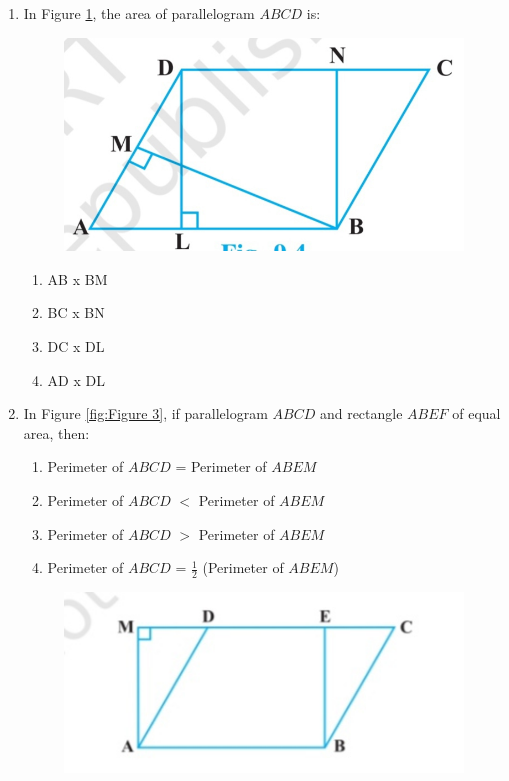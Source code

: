 \documentclass{article}
\begin{document}
\begin{enumerate}
\item In Figure \ref{fig:Figure 2}, the area of parallelogram $ABCD$ is:
\begin{figure}[!h]
\begin{center}
\includegraphics[width=\columnwidth]{figs/four.jpg}
\caption{}
\label{fig:Figure 2}
\end{center}
\end{figure}
\begin{enumerate}
\item AB x BM
\item BC x BN
\item DC x DL
\item AD x DL
\end{enumerate}
\item In Figure \ref{fig:Figure 3}, if parallelogram $ABCD$ and rectangle $ABEF$ of equal area, then:
\begin{enumerate}
\item Perimeter of $ABCD$ = Perimeter of $ABEM$
\item Perimeter of $ABCD$ $<$ Perimeter of $ABEM$
\item Perimeter of $ABCD$ $>$ Perimeter of $ABEM$
\item Perimeter of $ABCD$ = $\frac{1}{2}$ (Perimeter of $ABEM$)
\end{enumerate}
\begin{figure}[!h]
\begin{center}
\includegraphics[width=\columnwidth]{figs/five.jpg}

\end{center}
\end{figure}
\end{enumerate}
\end{document}
